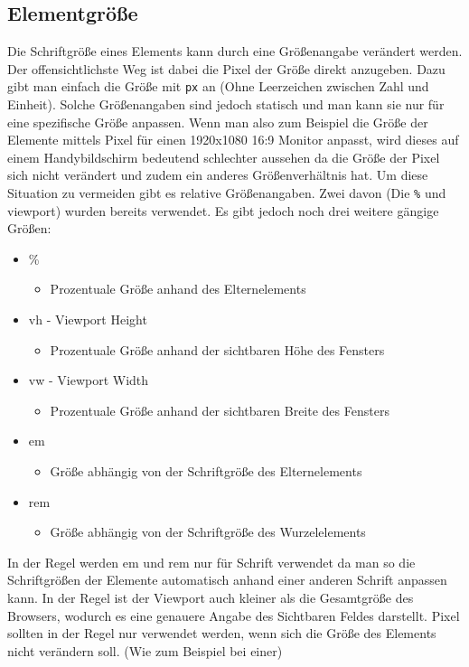 \documentclass{article}
\begin{document}
\begin{itemize}
		\subsection{Elementgröße}
		Die Schriftgröße eines Elements kann durch eine Größenangabe verändert werden. Der offensichtlichste Weg ist dabei die Pixel der Größe direkt anzugeben. Dazu gibt man einfach die Größe mit \texttt{px} an (Ohne Leerzeichen zwischen Zahl und Einheit). Solche Größenangaben sind jedoch statisch und man kann sie nur für eine spezifische Größe anpassen. Wenn man also zum Beispiel die Größe der Elemente mittels Pixel für einen 1920x1080 16:9 Monitor anpasst, wird dieses auf einem Handybildschirm bedeutend schlechter aussehen da die Größe der Pixel sich nicht verändert und zudem ein anderes Größenverhältnis hat. Um diese Situation zu vermeiden gibt es relative Größenangaben. Zwei davon (Die \texttt{\%} und viewport) wurden bereits verwendet. Es gibt jedoch noch drei weitere gängige Größen:
		\begin{itemize}
			\item{\%}
			\begin{itemize}
				\item{Prozentuale Größe anhand des Elternelements}
			\end{itemize}
			\item{vh - Viewport Height}
			\begin{itemize}
				\item{Prozentuale Größe anhand der sichtbaren Höhe des Fensters}
			\end{itemize}
			\item{vw - Viewport Width}
			\begin{itemize}
				\item{Prozentuale Größe anhand der sichtbaren Breite des Fensters}
			\end{itemize}
			\item{em}
			\begin{itemize}
				\item{Größe abhängig von der Schriftgröße des Elternelements}
			\end{itemize}
			\item{rem}
			\begin{itemize}
				\item{Größe abhängig von der Schriftgröße des Wurzelelements}
			\end{itemize}
	\end{itemize}
	In der Regel werden em und rem nur für Schrift verwendet da man so die Schriftgrößen der Elemente automatisch anhand einer anderen Schrift anpassen kann. In der Regel ist der Viewport auch kleiner als die Gesamtgröße des Browsers, wodurch es eine genauere Angabe des Sichtbaren Feldes darstellt. Pixel sollten in der Regel nur verwendet werden, wenn sich die Größe des Elements nicht verändern soll. (Wie zum Beispiel bei einer)

\end{itemize}
\end{document}

